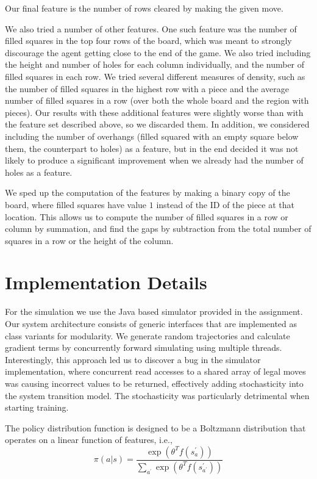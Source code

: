 \documentclass[11pt]{article}
\begin{document}
Our final feature is the number of rows cleared by making the given move.

We also tried a number of other features.  One such feature was the number of filled squares in the top four rows of the board, which was meant to strongly discourage the agent getting close to the end of the game.  We also tried including the height and number of holes for each column individually, and the number of filled squares in each row.  We tried several different measures of density, such as the number of filled squares in the highest row with a piece and the average number of filled squares in a row (over both the whole board and the region with pieces).  Our results with these additional features were slightly worse than with the feature set described above, so we discarded them.  In addition, we considered including the number of overhangs (filled squared with an empty square below them, the counterpart to holes) as a feature, but in the end decided it was not likely to produce a significant improvement when we already had the number of holes as a feature.

We sped up the computation of the features by making a binary copy of the board, where filled squares have value $1$ instead of the ID of the piece at that location.  This allows us to compute the number of filled squares in a row or column by summation, and find the gaps by subtraction from the total number of squares in a row or the height of the column.

\section{Implementation Details}
For the simulation we use the Java based simulator provided in the assignment. Our system architecture consists of generic interfaces that are implemented as class variants for modularity. We generate random trajectories and calculate gradient terms by concurrently forward simulating using multiple threads. Interestingly, this approach led us to discover a bug in the simulator implementation, where concurrent read accesses to a shared array of legal moves was causing incorrect values to be returned, effectively adding stochasticity into the system transition model. The stochasticity was particularly detrimental when starting training.

The policy distribution function is designed to be a Boltzmann distribution that operates on a linear function of features, i.e.,
\[ \pi(a|s)=\frac{\exp\left(\theta^{T}f\left(s_{a}^{\prime}\right)\right)}{\underset{a^{\prime}}{\sum}\exp\left(\theta^{T}f\left(s_{a^{\prime}}^{\prime}\right)\right)} \]
\end{document}
